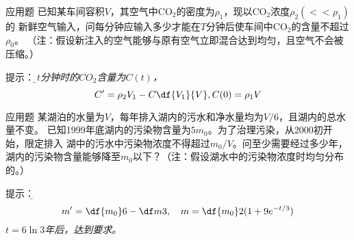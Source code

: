 \begin{frame}{应用题}
	\linespread{1.2}
	\;已知某车间容积$V$，其空气中CO$_2$的密度为$\rho_1$，现以CO$_2$浓度$\rho_2(<<\rho_1)$的
	新鲜空气输入，问每分钟应输入多少才能在$T$分钟后使车间中CO$_2$的含量不超过$\rho_0$。
	（注：假设新注入的空气能够与原有空气立即混合达到均匀，且空气不会被压缩。）

	\pause\alert{提示：}\it\b 设$t$分钟时的$CO_2$含量为$C(t)$，
	$$C'=\rho_2V_1-C\df{V_1}{V},C(0)=\rho_1V$$
\end{frame}

\begin{frame}{应用题}
	\linespread{1.2}
	\;某湖泊的水量为$V$，每年排入湖内的污水和净水量均为$V/6$，且湖内的总水量不变。
	已知1999年底湖内的污染物含量为$5m_0$。为了治理污染，从2000初开始，限定排入
	湖中的污水中污染物浓度不得超过$m_0/V$。问至少需要经过多少年，
	湖内的污染物含量能够降至$m_0$以下？（注：假设湖水中的污染物浓度时均匀分布的。）

	\pause\alert{提示：}\it\b 
	$$m'=\df{m_0}6-\df m3,\quad m=\df{m_0}2(1+9e^{-t/3})$$
	$t=6\ln3$年后，达到要求。
\end{frame}